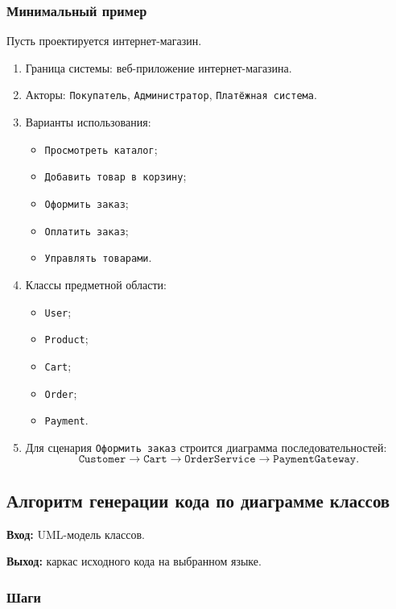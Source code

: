 \documentclass[12pt,a4paper]{article}
\begin{document}
\subsubsection*{Минимальный пример}

Пусть проектируется интернет-магазин.

\begin{enumerate}
    \item Граница системы: веб-приложение интернет-магазина.
    \item Акторы: \texttt{Покупатель}, \texttt{Администратор}, \texttt{Платёжная система}.
    \item Варианты использования:
    \begin{itemize}
        \item \texttt{Просмотреть каталог};
        \item \texttt{Добавить товар в корзину};
        \item \texttt{Оформить заказ};
        \item \texttt{Оплатить заказ};
        \item \texttt{Управлять товарами}.
    \end{itemize}
    \item Классы предметной области:
    \begin{itemize}
        \item \texttt{User};
        \item \texttt{Product};
        \item \texttt{Cart};
        \item \texttt{Order};
        \item \texttt{Payment}.
    \end{itemize}
    \item Для сценария \texttt{Оформить заказ} строится диаграмма последовательностей:
    \[
    \texttt{Customer} \rightarrow \texttt{Cart} \rightarrow \texttt{OrderService} \rightarrow \texttt{PaymentGateway}.
    \]
\end{enumerate}

\subsection{Алгоритм генерации кода по диаграмме классов}

\textbf{Вход:} UML-модель классов.

\textbf{Выход:} каркас исходного кода на выбранном языке.

\subsubsection*{Шаги}
\end{document}
